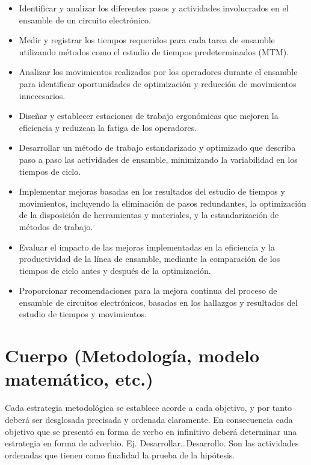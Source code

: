     \begin{itemize}
        \item Identificar y analizar los diferentes pasos y actividades involucrados en el ensamble de un circuito electrónico.
        \item Medir y registrar los tiempos requeridos para cada tarea de ensamble utilizando métodos como el estudio de tiempos predeterminados (MTM).
        \item Analizar los movimientos realizados por los operadores durante el ensamble para identificar oportunidades de optimización y reducción de movimientos innecesarios.
        \item Diseñar y establecer estaciones de trabajo ergonómicas que mejoren la eficiencia y reduzcan la fatiga de los operadores.
        \item Desarrollar un método de trabajo estandarizado y optimizado que describa paso a paso las actividades de ensamble, minimizando la variabilidad en los tiempos de ciclo.
        \item Implementar mejoras basadas en los resultados del estudio de tiempos y movimientos, incluyendo la eliminación de pasos redundantes, la optimización de la disposición de herramientas y materiales, y la estandarización de métodos de trabajo.
        \item Evaluar el impacto de las mejoras implementadas en la eficiencia y la productividad de la línea de ensamble, mediante la comparación de los tiempos de ciclo antes y después de la optimización.
        \item Proporcionar recomendaciones para la mejora continua del proceso de ensamble de circuitos electrónicos, basadas en los hallazgos y resultados del estudio de tiempos y movimientos.
    \end{itemize}
    
    \section{Cuerpo (Metodología, modelo matemático, etc.)}
    
    Cada estrategia metodológica se establece acorde a cada objetivo, y por tanto deberá ser desglosada precisada y ordenada claramente. En consecuencia cada objetivo que se presentó en forma de verbo en infinitivo deberá determinar una estrategia en forma de adverbio. Ej. Desarrollar…Desarrollo. Son las actividades ordenadas que tienen como finalidad la prueba de la hipótesis. 
    
